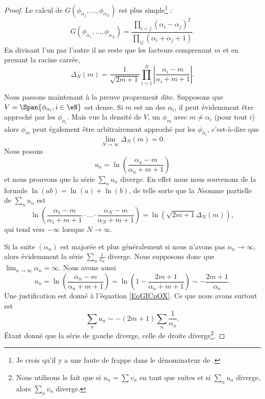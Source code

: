 \begin{proof}
    Le calcul de \( G(\phi_{\alpha_1},\ldots, \phi_{\alpha_N})\) est plus simple\footnote{Je crois qu'il y a une faute de frappe dans le dénominateur de \cite{jqZSyG}.} :
    \begin{equation}
        G(\phi_{\alpha_1},\ldots, \phi_{\alpha_N})=\frac{ \prod_{i<j}(\alpha_i-\alpha_j)^2 }{ \prod_{ij}(\alpha_i+\alpha_j+1) }.
    \end{equation}
    En divisant l'un par l'autre il ne reste que les facteurs comprenant \( m\) et en prenant la racine carrée,
    \begin{equation}    \label{EqANiuNB}
        \Delta_N(m)=\frac{1}{ \sqrt{2m+1} }\prod_{i=1}^N\left| \frac{ \alpha_i-m }{ \alpha_i+m+1 } \right| .
    \end{equation}

    Nous passons maintenant à la preuve proprement dite. Supposons que \( V=\Span\{ \phi_{\alpha_i},i\in \eN \}\) est dense. Si \( m\) est un des \( \alpha_i\), il peut évidemment être approché par les \( \phi_{\alpha_i}\). Mais vue la densité de \( V\), un \( \phi_m\) avec \( m\neq \alpha_i\) (pour tout \( i\)) alors \( \phi_m\) peut également être arbitrairement approché par les \( \phi_{\alpha_i}\), c'est-à-dire que
    \begin{equation}
        \lim_{N\to \infty} \Delta_N(m)=0.
    \end{equation}
    Nous posons
    \begin{equation}
        u_n=\ln\left( \frac{ \alpha_n-m }{ \alpha_n+m+1 } \right)
    \end{equation}
    et nous prouvons que la série \( \sum_nu_n\) diverge. En effet nous nous souvenons de la formule \( \ln(ab)=\ln(a)+\ln(b)\), de telle sorte que la \( N\)\ieme somme partielle de \( \sum_nu_n\) est
    \begin{equation}
        \ln\left( \frac{ \alpha_1-m }{ \alpha_1+m+1 }\cdot\ldots\cdot \frac{ \alpha_N-m }{ \alpha_N+m+1 } \right)=\ln\left( \sqrt{2m+1}\Delta_N(m) \right),
    \end{equation}
    qui tend vers \( -\infty\) lorsque \( N\to \infty\).

    Si la suite \( (\alpha_n)\) est majorée et plus généralement si nous n'avons pas \( \alpha_n\to \infty\), alors évidemment la série \( \sum_n\frac{1}{ \alpha_n }\) diverge. Nous supposons donc que \( \lim_{n\to \infty} \alpha_n=\infty\). Nous avons aussi
    \begin{equation}
        u_n=\ln\left( \frac{ \alpha_n-m }{ \alpha_n+m+1 } \right)=\ln\left( 1-\frac{ 2m+1 }{ \alpha_n+m+1 } \right)\sim-\frac{ 2m+1 }{ \alpha_n }.
    \end{equation}
    Une justification est donné à l'équation \eqref{EqGICpOX}. Ce que nous avons surtout est
    \begin{equation}
        \sum_n u_n\sim -(2m+1)\sum_n\frac{1}{ \alpha_n }.
    \end{equation}
    Étant donné que la série de gauche diverge, celle de droite diverge\footnote{Nous utilisons le fait que si \( u_n=\sum v_n\) en tant que suites et si \( \sum_nu_n\) diverge, alors \( \sum_nv_n\) diverge.}.


\end{proof}
